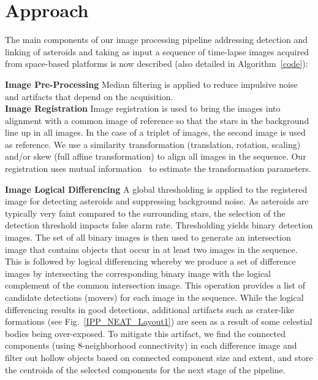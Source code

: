 \documentclass{article}
\begin{document}

\section{Approach}
\label{sec:approach}

The main components of our image processing pipeline addressing detection and linking of asteroids and taking as input a sequence of time-lapse images acquired from space-based platforms is now described  (also detailed in 
 Algorithm~\ref{code}):

\noindent
{\bf Image Pre-Processing} Median filtering is applied  to reduce impulsive noise and artifacts that depend on the acquisition.\\
{\bf Image Registration}
Image registration is used to bring the images into alignment with a common image of reference so that the stars in the background line up in all images.  In the case of a triplet of images, the second image is used as reference.  We use a similarity transformation (translation, rotation, scaling) and/or skew (full affine transformation) to align all images in the sequence.  Our registration uses mutual information~\cite{viola1997alignment} to estimate the transformation parameters.

{\bf Image Logical Differencing}
A global thresholding is applied to the registered image for detecting asteroids and suppressing background noise.  As asteroids are typically very faint compared to the surrounding stars, the selection of the detection threshold impacts false alarm rate.  Thresholding yields binary detection images.  The set of all binary images is then used to generate an intersection image that contains objects that occur in at least two images in the sequence.  This is followed by logical differencing whereby we produce a set of difference images by intersecting the corresponding binary image with the logical complement of the common intersection image.  This operation provides a list of candidate detections (movers) for each image in the sequence.  While the logical differencing results in good detections, additional artifacts such as crater-like formations (see Fig.~\ref{IPP_NEAT_Layout1}) are seen as a result of some celestial bodies being over-exposed. To mitigate this artifact, we find the connected components (using 8-neighborhood connectivity) in each difference image and filter out hollow objects based on connected component size and extent, and store the centroids of the selected components for the next stage of the pipeline. 
\end{document}

